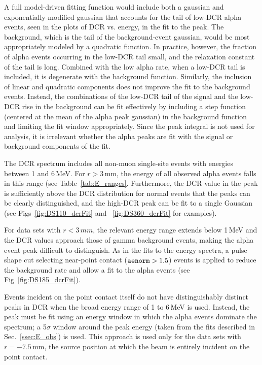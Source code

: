 \documentclass[groupedaddress,rmp,amsmath,amssymb,bibnotes,altaffilletter,twocolumn]{revtex4-1}
\begin{document}
A full model-driven fitting function would include both a gaussian and exponentially-modified gaussian that accounts for the tail of low-DCR alpha events, seen in the plots of DCR vs. energy, in the fit to the peak. The background, which is the tail of the background-event gaussian, would be most appropriately modeled by a quadratic function. In practice, however, the fraction of alpha events occurring in the low-DCR tail small, and the relaxation constant of the tail is long. Combined with the low alpha rate, when a low-DCR tail is included, it is degenerate with the background function. Similarly, the inclusion of linear and quadratic components does not improve the fit to the background events. Instead, the combinations of the low-DCR tail of the signal and the low-DCR rise in the background can be fit effectively by including a step function (centered at the mean of the alpha peak gaussian) in the background function and limiting the fit window appropriately. Since the peak integral is not used for analysis, it is irrelevant whether the alpha peaks are fit with the signal or background components of the fit. 

The DCR spectrum includes all non-muon single-site events with energies between 1 and 6\,MeV. For $r > 3$\,mm, the energy of all observed alpha events falls in this range (see Table~\ref{tab:E_ranges}. Furthermore, the DCR value in the peak is sufficiently above the DCR distribution for normal events that the peaks can be clearly distinguished, and the high-DCR peak can be fit to a single Gaussian (see Figs~\ref{fig:DS110_dcrFit} and ~\ref{fig:DS360_dcrFit} for examples).

For data sets with $r<3\,mm$, the relevant energy range extends below 1\,MeV and the DCR values approach those of gamma background events, making the alpha event peak difficult to distinguish. As in the fits to the energy spectra, a pulse shape cut selecting near-point contact (${\tt aenorm} > 1.5$) events is applied to reduce the background rate and allow a fit to the alpha events (see Fig~\ref{fig:DS185_dcrFit}).

Events incident on the point contact itself do not have distinguishably distinct peaks in DCR when the broad energy range of 1 to 6\,MeV is used. Instead, the peak must be fit using an energy window in which the alpha events dominate the spectrum; a 5$\sigma$ window around the peak energy (taken from the fits described in Sec.~\ref{ssec:E_obs}) is used. This approach is used only for the data sets with $r=-7.5$\,mm, the source position at which the beam is entirely incident on the point contact. 
\end{document}
